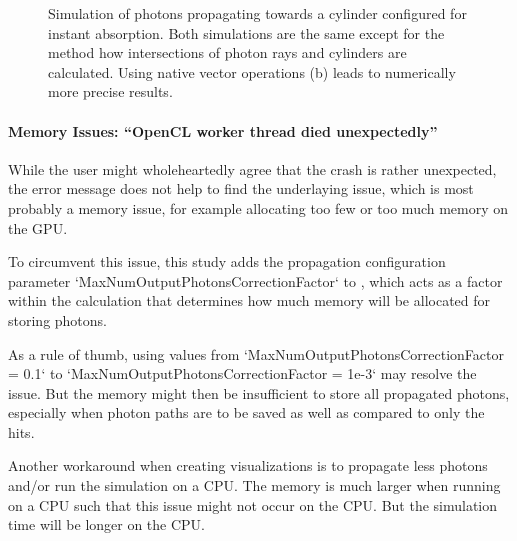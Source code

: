 \begin{figure}[htbp]
  \hfill
  \hfill
  \caption{Simulation of photons propagating towards a cylinder configured for instant absorption. Both simulations are the same except for the method how intersections of photon rays and cylinders are calculated. Using native vector operations (b) leads to numerically more precise results.}
  \label{fig:usie5Ohj}
\end{figure}



\paragraph{Memory Issues: ``OpenCL worker thread died unexpectedly''}
While the user might wholeheartedly agree that the crash is rather unexpected, the error message does not help to find the underlaying issue, which is most probably a memory issue, for example allocating too few or too much memory on the GPU.

To circumvent this issue, this study adds the propagation configuration parameter `MaxNumOutputPhotonsCorrectionFactor` to \clsim, which acts as a factor within the calculation that determines how much memory will be allocated for storing photons.

As a rule of thumb, using values from `MaxNumOutputPhotonsCorrectionFactor = 0.1` to `MaxNumOutputPhotonsCorrectionFactor = 1e-3` may resolve the issue. But the memory might then be insufficient to store all propagated photons, especially when photon paths are to be saved as well as compared to only the hits.

Another workaround when creating visualizations is to propagate less photons and/or run the simulation on a CPU. The memory is much larger when running on a CPU such that this issue might not occur on the CPU. But the simulation time will be longer on the CPU.


